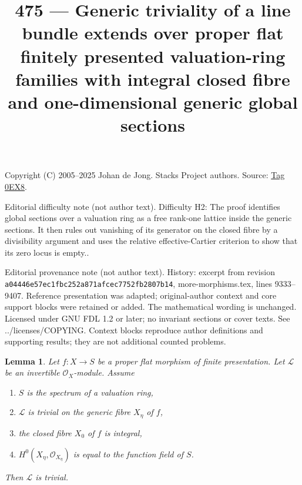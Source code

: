 \documentclass{amsart}
\theoremstyle{plain}
\newtheorem{lemma}[subsection]{Lemma}
\theoremstyle{definition}
\theoremstyle{remark}
\numberwithin{equation}{subsection}
\begin{document}
\title[Stacks Project, Tag 0EX8]{475 --- Generic triviality of a line bundle extends over proper flat finitely presented valuation-ring families with integral closed fibre and one-dimensional generic global sections}
\maketitle
\noindent Copyright (C) 2005--2025 Johan de Jong. Stacks Project authors. Source: \href{https://stacks.math.columbia.edu/tag/0EX8}{Tag 0EX8}.

\noindent Editorial difficulty note (not author text). Difficulty H2: The proof identifies global sections over a valuation ring as a free rank-one lattice inside the generic sections. It then rules out vanishing of its generator on the closed fibre by a divisibility argument and uses the relative effective-Cartier criterion to show that its zero locus is empty..

\noindent Editorial provenance note (not author text). History: excerpt from revision \texttt{a0444\allowbreak 6e57e\allowbreak c1fbc\allowbreak 252a8\allowbreak 71afc\allowbreak ec775\allowbreak 2fb28\allowbreak 07b14}, more-morphisms.tex, lines 9333--9407. Reference presentation was adapted; original-author context and core support blocks were retained or added. The mathematical wording is unchanged. Licensed under GNU FDL 1.2 or later; no invariant sections or cover texts. See ../licenses/COPYING. Context blocks reproduce author definitions and supporting results; they are not additional counted problems.

\begin{lemma}
\label{lemma-triviality-generic-fibre-valuation-ring}
Let $f : X \to S$ be a proper flat morphism of finite presentation.
Let $\mathcal{L}$ be an invertible $\mathcal{O}_X$-module.
Assume
\begin{enumerate}
\item $S$ is the spectrum of a valuation ring,
\item $\mathcal{L}$ is trivial on the generic fibre $X_\eta$ of $f$,
\item the closed fibre $X_0$ of $f$ is integral,
\item $H^0(X_\eta, \mathcal{O}_{X_\eta})$ is equal to the function field of $S$.
\end{enumerate}
Then $\mathcal{L}$ is trivial.
\end{lemma}
\end{document}
